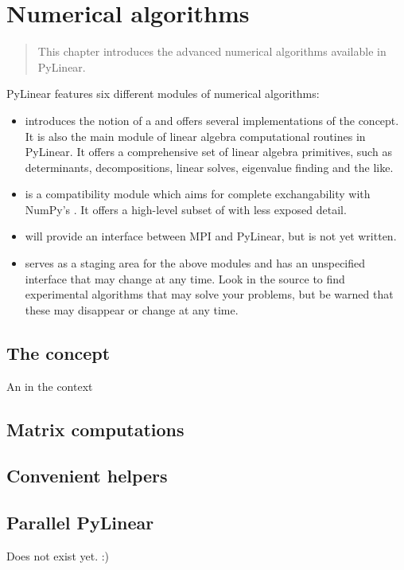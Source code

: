 \chapter{Numerical algorithms}
\label{cha:numerics}

\begin{quote}
   This chapter introduces the advanced numerical algorithms available
   in PyLinear.
\end{quote}

PyLinear features six different modules of numerical algorithms:
\begin{itemize}
  \item {} introduces the notion of a
     and offers several implementations of the 
    concept. It is also the main module of linear
    algebra computational routines in PyLinear. It offers a
    comprehensive set of linear algebra primitives, such as
    determinants, decompositions, linear solves, eigenvalue finding
    and the like.
  \item {} is a compatibility module 
    which aims for complete exchangability with NumPy's .
    It offers a high-level subset of  
    with less exposed detail.
  \item {} will provide an interface between
    MPI and PyLinear, but is not yet written.
  \item {} serves as a staging area for
    the above modules and has an unspecified interface that may 
    change at any time. Look in the source to find experimental
    algorithms that may solve your problems, but be warned that
    these may disappear or change at any time.
\end{itemize}

\section{The  concept}

An  in the context 
\section{Matrix computations}
\section{Convenient helpers}
\section{Parallel PyLinear}

Does not exist yet. :)
